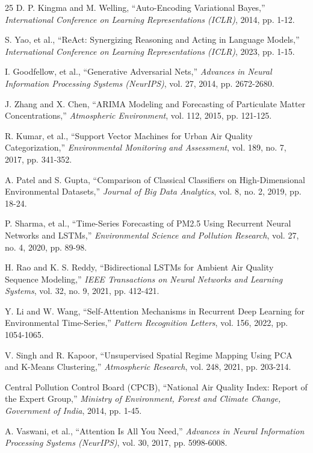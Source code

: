 \documentclass[conference]{IEEEtran}
\begin{document}
\begin{thebibliography}{25}
D. P. Kingma and M. Welling, ``Auto-Encoding Variational Bayes,'' \textit{International Conference on Learning Representations (ICLR)}, 2014, pp. 1-12.

S. Yao, et al., ``ReAct: Synergizing Reasoning and Acting in Language Models,'' \textit{International Conference on Learning Representations (ICLR)}, 2023, pp. 1-15.

I. Goodfellow, et al., ``Generative Adversarial Nets,'' \textit{Advances in Neural Information Processing Systems (NeurIPS)}, vol. 27, 2014, pp. 2672-2680.

J. Zhang and X. Chen, ``ARIMA Modeling and Forecasting of Particulate Matter Concentrations,'' \textit{Atmospheric Environment}, vol. 112, 2015, pp. 121-125.

R. Kumar, et al., ``Support Vector Machines for Urban Air Quality Categorization,'' \textit{Environmental Monitoring and Assessment}, vol. 189, no. 7, 2017, pp. 341-352.

A. Patel and S. Gupta, ``Comparison of Classical Classifiers on High-Dimensional Environmental Datasets,'' \textit{Journal of Big Data Analytics}, vol. 8, no. 2, 2019, pp. 18-24.

P. Sharma, et al., ``Time-Series Forecasting of PM2.5 Using Recurrent Neural Networks and LSTMs,'' \textit{Environmental Science and Pollution Research}, vol. 27, no. 4, 2020, pp. 89-98.

H. Rao and K. S. Reddy, ``Bidirectional LSTMs for Ambient Air Quality Sequence Modeling,'' \textit{IEEE Transactions on Neural Networks and Learning Systems}, vol. 32, no. 9, 2021, pp. 412-421.

Y. Li and W. Wang, ``Self-Attention Mechanisms in Recurrent Deep Learning for Environmental Time-Series,'' \textit{Pattern Recognition Letters}, vol. 156, 2022, pp. 1054-1065.

V. Singh and R. Kapoor, ``Unsupervised Spatial Regime Mapping Using PCA and K-Means Clustering,'' \textit{Atmospheric Research}, vol. 248, 2021, pp. 203-214.

Central Pollution Control Board (CPCB), ``National Air Quality Index: Report of the Expert Group,'' \textit{Ministry of Environment, Forest and Climate Change, Government of India}, 2014, pp. 1-45.

A. Vaswani, et al., ``Attention Is All You Need,'' \textit{Advances in Neural Information Processing Systems (NeurIPS)}, vol. 30, 2017, pp. 5998-6008.


\end{thebibliography}
\end{document}
